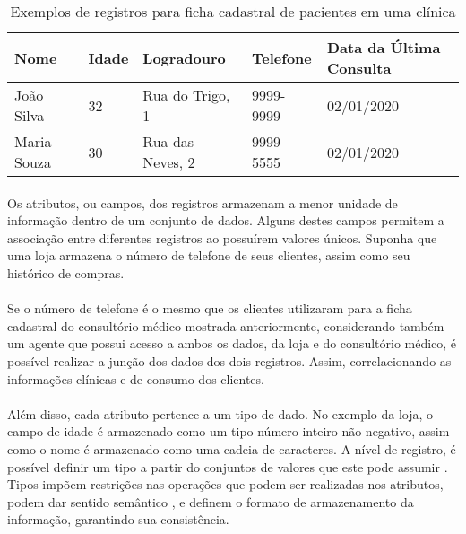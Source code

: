 \begin{table}[ht]
    \caption{Exemplos de registros para ficha cadastral de pacientes em uma clínica}
    \label{table:registros}
    \begin{center}
        \begin{tabular}{| l | l | l | l | l |}
        \hline
        Nome & Idade & Logradouro & Telefone & Data da Última Consulta \\ \hline
        João Silva & 32 & Rua do Trigo, 1 & 9999-9999 & 02/01/2020 \\ \hline
        Maria Souza & 30 & Rua das Neves, 2 & 9999-5555 & 02/01/2020 \\ \hline
        \hline
        \end{tabular}
    \end{center}
\end{table}

\paragraph{} Os atributos, ou campos, dos registros armazenam a menor unidade de informação dentro de um conjunto de dados.
Alguns destes campos permitem a associação entre diferentes registros ao possuírem valores únicos.
Suponha que uma loja armazena o número de telefone 
de seus clientes, assim como seu histórico de compras. 

\paragraph{} Se o número de telefone é o mesmo que os clientes utilizaram para a ficha cadastral do consultório 
médico mostrada anteriormente, considerando também um agente que possui acesso a ambos os dados, da loja e do 
consultório médico, é possível realizar a junção dos dados dos dois registros. Assim, correlacionando as informações clínicas e de consumo dos clientes.

\paragraph{} Além disso, cada atributo pertence a um tipo de dado. No exemplo da loja, o campo de idade é armazenado 
como um tipo número inteiro não negativo, assim como o nome é armazenado como uma cadeia de caracteres.
A nível de registro, é possível definir um tipo a partir do conjuntos de valores que este pode assumir \cite{cardelli1985types}. 
Tipos impõem restrições nas operações que podem ser realizadas nos atributos, podem dar sentido semântico \cite{donahue1979semantics},
e definem o formato de armazenamento da informação, garantindo sua consistência.

